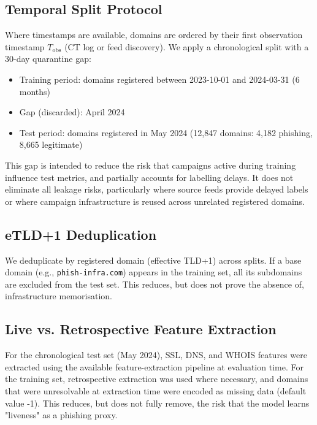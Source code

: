 \documentclass[conference]{IEEEtran}
\begin{document}
\subsection{Temporal Split Protocol}

Where timestamps are available, domains are ordered by their first observation timestamp $T_{\text{obs}}$ (CT log or feed discovery). We apply a chronological split with a 30-day quarantine gap:

\begin{itemize}
    \item Training period: domains registered between 2023-10-01 and 2024-03-31 (6 months)
    \item Gap (discarded): April 2024
    \item Test period: domains registered in May 2024 (12,847 domains: 4,182 phishing, 8,665 legitimate)
\end{itemize}

This gap is intended to reduce the risk that campaigns active during training influence test metrics, and partially accounts for labelling delays. It does not eliminate all leakage risks, particularly where source feeds provide delayed labels or where campaign infrastructure is reused across unrelated registered domains.

\subsection{eTLD+1 Deduplication}

We deduplicate by registered domain (effective TLD+1) across splits. If a base domain (e.g., \texttt{phish-infra.com}) appears in the training set, all its subdomains are excluded from the test set. This reduces, but does not prove the absence of, infrastructure memorisation.

\subsection{Live vs. Retrospective Feature Extraction}

For the chronological test set (May 2024), SSL, DNS, and WHOIS features were extracted using the available feature-extraction pipeline at evaluation time. For the training set, retrospective extraction was used where necessary, and domains that were unresolvable at extraction time were encoded as missing data (default value -1). This reduces, but does not fully remove, the risk that the model learns "liveness" as a phishing proxy.
\end{document}

